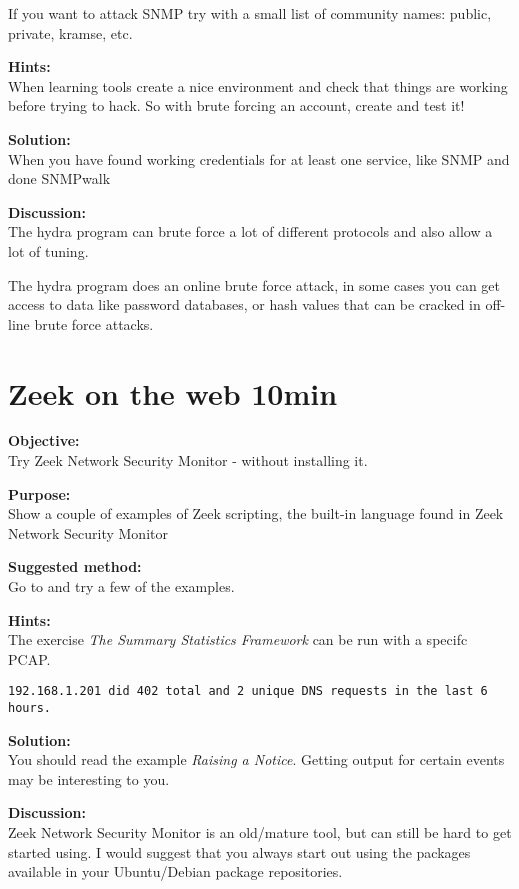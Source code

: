 \documentclass[a4paper,11pt,notitlepage]{report}
\begin{document}
If you want to attack SNMP try with a small list of community names:
public, private, kramse, etc.


{\bf Hints:} \\
When learning tools create a nice environment and check that things are working
before trying to hack. So with brute forcing an account, create and test it!

{\bf Solution:}\\
When you have found working credentials for at least one service, like SNMP and done SNMPwalk

{\bf Discussion:}\\
The hydra program can brute force a lot of different protocols and also
allow a lot of tuning.

The hydra program does an online brute force attack, in some cases you
can get access to data like password databases, or hash values that can
be cracked in off-line brute force attacks.



\chapter{Zeek on the web 10min}
\label{ex:zeekweb}


{\bf Objective:} \\
Try Zeek Network Security Monitor - without installing it.


{\bf Purpose:}\\
Show a couple of examples of Zeek scripting, the built-in language found in Zeek Network Security Monitor


{\bf Suggested method:}\\
Go to  and try a few of the examples.

{\bf Hints:}\\
The exercise
\emph{The Summary Statistics Framework} can be run with a specifc PCAP.

\verb+192.168.1.201 did 402 total and 2 unique DNS requests in the last 6 hours.+

{\bf Solution:}\\
You should read the example \emph{Raising a Notice}. Getting output for certain events may be interesting to you.


{\bf Discussion:}\\
Zeek Network Security Monitor is an old/mature tool, but can still be hard to get started using. I would suggest that you always start out using the packages available in your Ubuntu/Debian package repositories.
\end{document}
